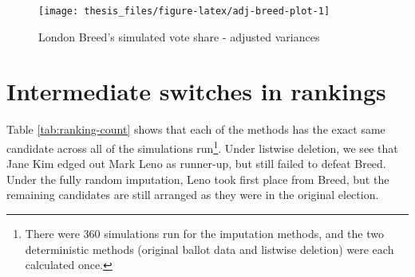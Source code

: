 \documentclass[12pt,twoside]{reedthesis}
\begin{document}
\begin{figure}
\texttt{[image: thesis\_files/figure-latex/adj-breed-plot-1]} \caption{London Breed's simulated vote share - adjusted variances}\label{fig:adj-breed-plot}
\end{figure}
\hypertarget{intermediate-switches-in-rankings}{%
\section{Intermediate switches in rankings}\label{intermediate-switches-in-rankings}}
\begin{table}[t]

\caption[Simulated candidate rankings]{\label{tab:ranking-count}Candidate ranking for each imputation method}
\centering
{}
\end{table}
Table \ref{tab:ranking-count} shows that each of the methods has the exact same candidate across all of the simulations run\footnote{There were 360 simulations run for the imputation methods, and the two deterministic methods (original ballot data and listwise deletion) were each calculated once.}. Under listwise deletion, we see that Jane Kim edged out Mark Leno as runner-up, but still failed to defeat Breed. Under the fully random imputation, Leno took first place from Breed, but the remaining candidates are still arranged as they were in the original election.
\end{document}
